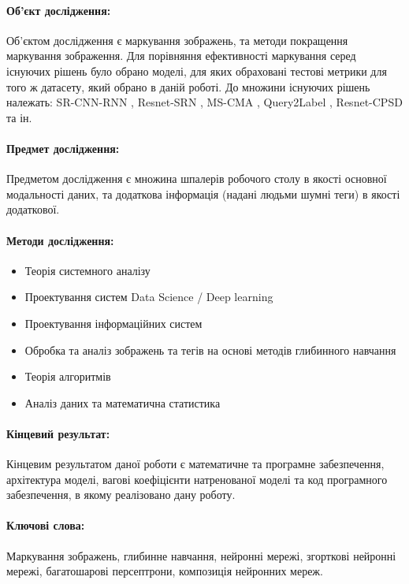 \documentclass{udstu}
\begin{document}
\paragraph{\textbf{Об'єкт дослідження:}}
Об'єктом дослідження є маркування зображень, та методи покращення маркування зображення.
Для порівняння ефективності маркування серед існуючих рішень було обрано моделі,
для яких обраховані тестові метрики для того ж датасету, який обрано в даній роботі.
До множини існуючих рішень належать: SR-CNN-RNN \cite{sr-cnn-rnn}, Resnet-SRN \cite{srn},
MS-CMA \cite{cma}, Query2Label \cite{q2l}, Resnet-CPSD \cite{cpsd} та ін.

\paragraph{\textbf{Предмет дослідження:}}
Предметом дослідження є множина шпалерів робочого столу в якості основної модальності даних,
та додаткова інформація (надані людьми шумні теги) в якості додаткової.

\paragraph{\textbf{Методи дослідження:}}
\begin{itemize}[*]
	\item Теорія системного аналізу
	\item Проектування систем Data Science / Deep learning
	\item Проектування інформаційних систем
	\item Обробка та аналіз зображень та тегів на основі методів глибинного навчання
	\item Теорія алгоритмів
	\item Аналіз даних та математична статистика
\end{itemize}

\paragraph{\textbf{Кінцевий результат:}}
Кінцевим результатом даної роботи є математичне та програмне забезпечення, архітектура моделі,
вагові коефіцієнти натренованої моделі та код програмного забезпечення, в якому реалізовано дану роботу.

\paragraph{\textbf{Ключові слова:}}
Маркування зображень, глибинне навчання, нейронні мережі, згорткові нейронні мережі,
багатошарові персептрони, композиція нейронних мереж.
\end{document}

